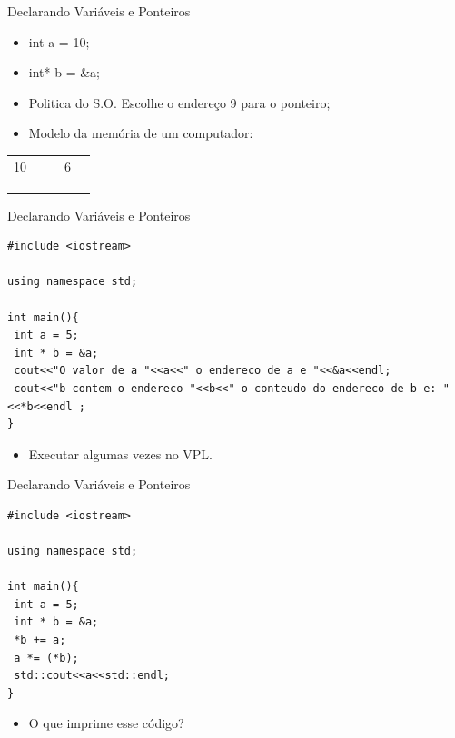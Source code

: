 \documentclass[12pt,table,xcolor={dvipsnames}]{beamer}
\begin{document}
\begin{frame}[fragile]{Declarando Variáveis e Ponteiros}
\begin{itemize}
\item int a = 10;
\item int* b = \&a;
\item Politica do S.O. Escolhe o endereço 9 para o ponteiro;
\item Modelo da memória de um computador:
\end{itemize}
{
\begin{tabular}{ |p{1cm}|p{1cm}|p{1cm}|p{1cm}|p{1cm}| }
\hline
& & & & \\ \hline
10 & & & 6 & \\ \hline
& & & & \\ \hline
& & & & \\ \hline
& & & & \\ \hline
\end{tabular}
}
\end{frame}

\begin{frame}[fragile]{Declarando Variáveis e Ponteiros}
\begin{lstlisting}
#include <iostream>

using namespace std;

int main(){
 int a = 5;
 int * b = &a; 
 cout<<"O valor de a "<<a<<" o endereco de a e "<<&a<<endl;
 cout<<"b contem o endereco "<<b<<" o conteudo do endereco de b e: "<<*b<<endl ; 
}
\end{lstlisting}
\begin{itemize}
\item Executar algumas vezes no VPL.
\end{itemize}
\end{frame}

\begin{frame}[fragile]{Declarando Variáveis e Ponteiros}
\begin{lstlisting}
#include <iostream>

using namespace std;

int main(){
 int a = 5;
 int * b = &a; 
 *b += a;
 a *= (*b);
 std::cout<<a<<std::endl; 
}
\end{lstlisting}
\begin{itemize}
\item O que imprime esse código?
\end{itemize}
\end{frame}
\end{document}

